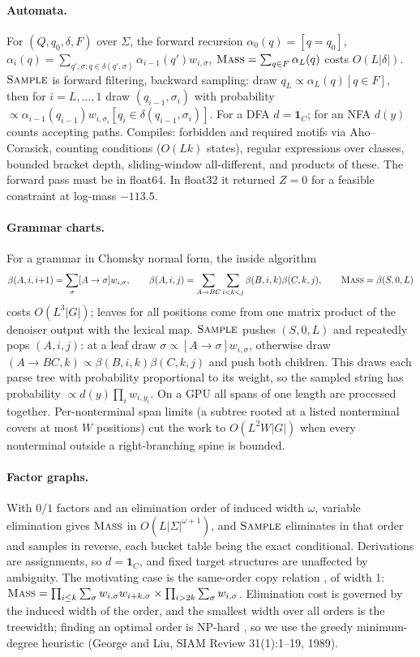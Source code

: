 \documentclass[11pt]{article}
\theoremstyle{definition}
\newcommand{\one}{\mathbf{1}}
\newcommand{\op}[1]{\textup{\textsc{#1}}}
\begin{document}
\paragraph{Automata.}
For $(Q,q_0,\delta,F)$ over $\Sigma$, the forward recursion
$\alpha_0(q)=[q=q_0]$, $\alpha_i(q)=\sum_{q',\sigma:q\in\delta(q',\sigma)}\alpha_{i-1}(q')w_{i,\sigma}$,
$\op{Mass}=\sum_{q\in F}\alpha_L(q)$ costs $O(L|\delta|)$. $\op{Sample}$ is forward filtering, backward sampling:
draw $q_L\propto\alpha_L(q)[q\in F]$, then for $i=L,\dots,1$ draw $(q_{i-1},\sigma_i)$ with probability
$\propto\alpha_{i-1}(q_{i-1})w_{i,\sigma_i}[q_i\in\delta(q_{i-1},\sigma_i)]$. For a DFA $d=\one_C$; for an NFA
$d(y)$ counts accepting paths. Compiles: forbidden and required motifs via Aho--Corasick, counting conditions
($O(Lk)$ states), regular expressions over classes, bounded bracket depth, sliding-window all-different, and
products of these. The forward pass must be in float64. In float32 it returned $Z=0$ for a feasible constraint at
log-mass $-113.5$.

\paragraph{Grammar charts.}
For a grammar in Chomsky normal form, the inside algorithm
\[
  \beta(A,i,i{+}1)=\sum_\sigma[A\to\sigma]w_{i,\sigma},\qquad
  \beta(A,i,j)=\sum_{A\to BC}\sum_{i<k<j}\beta(B,i,k)\beta(C,k,j),\qquad
  \op{Mass}=\beta(S,0,L)
\]
costs $O(L^3|G|)$; leaves for all positions come from one matrix product of the denoiser output with the lexical
map. $\op{Sample}$ pushes $(S,0,L)$ and repeatedly pops $(A,i,j)$: at a leaf draw $\sigma\propto[A\to\sigma]
w_{i,\sigma}$, otherwise draw $(A\to BC,k)\propto\beta(B,i,k)\beta(C,k,j)$ and push both children. This draws each
parse tree with probability proportional to its weight, so the sampled string has probability
$\propto d(y)\prod_iw_{i,y_i}$. On a GPU all spans of one length are processed together. Per-nonterminal span
limits (a subtree rooted at a listed nonterminal covers at most $W$ positions) cut the work to $O(L^2W|G|)$ when
every nonterminal outside a right-branching spine is bounded.

\paragraph{Factor graphs.}
With $0/1$ factors and an elimination order of induced width $\omega$, variable elimination gives $\op{Mass}$ in
$O(L|\Sigma|^{\omega+1})$, and $\op{Sample}$ eliminates in that order and samples in reverse, each bucket table
being the exact conditional. Derivations are assignments, so $d=\one_C$, and fixed target structures are
unaffected by ambiguity. The motivating case is the same-order copy relation \cite{sz26}, of width 1:
$\op{Mass}=\prod_{i\le k}\sum_\sigma w_{i,\sigma}w_{i+k,\sigma}\times\prod_{i>2k}\sum_\sigma w_{i,\sigma}$.
Elimination cost is governed by the induced width of the order, and the smallest width over all orders is
the treewidth; finding an optimal order is NP-hard \cite{arnborg1987}, so we use the greedy minimum-degree
heuristic (George and Liu, SIAM Review 31(1):1--19, 1989).
\end{document}
